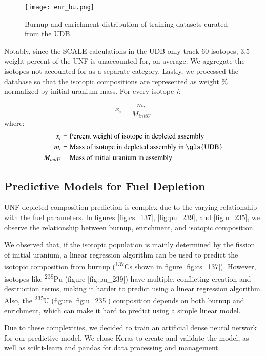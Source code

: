 \begin{figure}
    \centering
    \texttt{[image: enr\_bu.png]}
    \caption{Burnup and enrichment distribution of training
             datasets curated from the \gls{UDB}.}
    \label{fig:enr_bu}
\end{figure}


Notably, since the SCALE calculations in the \gls{UDB} only track 60 isotopes,
3.5 weight percent of the \gls{UNF} is unaccounted for, on average. We
aggregate the isotopes not accounted for as a separate category. Lastly,
we processed the database so that the isotopic compositions are 
represented as weight \% normalized by initial uranium mass.
For every isotope \textit{i}:

\begin{equation}
x_i = \frac{m_i}{M_{initU}}
\end{equation}
where:
\begin{align}
x_i &= \text{Percent weight of isotope in depleted assembly}\\
m_i &= \text{Mass of isotope in depleted assembly in \gls{UDB}}\\
M_{initU} &= \text{Mass of initial uranium in assembly}
\end{align}


\subsection{Predictive Models for Fuel Depletion}

\gls{UNF} depleted composition prediction is complex
due to the varying relationship with the fuel parameters.
In figures \ref{fig:cs_137}, \ref{fig:pu_239}, and \ref{fig:u_235},
we observe the relationship between
burnup, enrichment, and isotopic composition.

We observed that, if the isotopic population is mainly determined by
the fission of initial uranium, a linear regression algorithm
can be used to predict the isotopic composition from burnup
(\textsuperscript{137}Cs shown in figure \ref{fig:cs_137}).
However, isotopes like \textsuperscript{239}Pu (figure \ref{fig:pu_239}) have multiple, conflicting creation
and destruction terms, making it harder to predict using a
linear regression algorithm. Also, the \textsuperscript{235}U (figure \ref{fig:u_235})
composition
depends on both burnup and enrichment, which can make it
hard to predict using a simple linear model.

Due to these complexities, we decided to train an artificial
dense neural network for our predictive model. We chose
Keras \cite{collet_keras_2015} to create and validate the model,
as well as scikit-learn \cite{pedregosa_scikit-learn_2011}
and pandas \cite{mckinney-proc-scipy-2010} for data processing and management.

